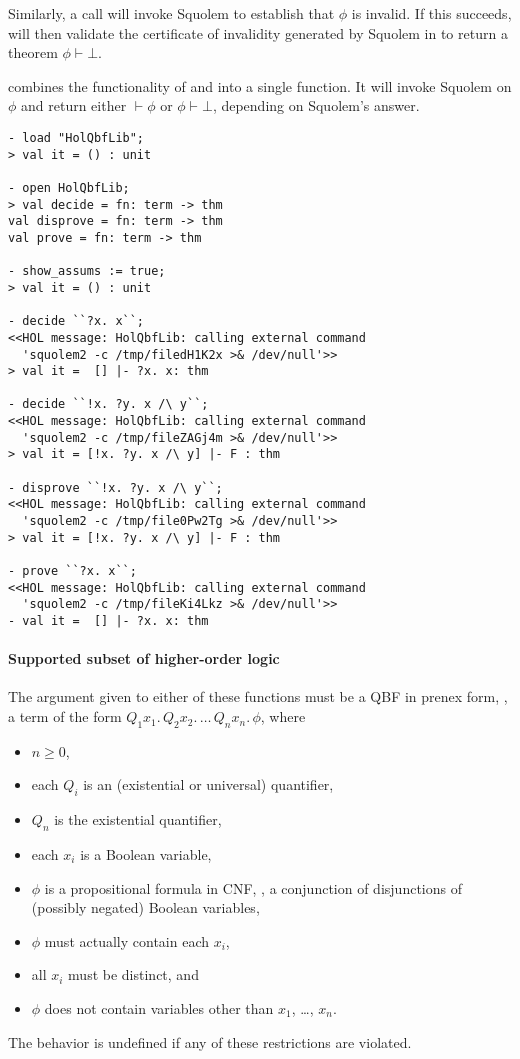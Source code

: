 Similarly, a call  will invoke Squolem to
establish that $\phi$ is invalid.  If this succeeds, 
will then validate the certificate of invalidity generated by Squolem
in \HOL{} to return a theorem $\phi \vdash \bot$.

 combines the functionality of  and
 into a single function.  It will invoke Squolem on
$\phi$ and return either $\vdash \phi$ or $\phi \vdash \bot$,
depending on Squolem's answer.

\begin{session}
\begin{verbatim}
- load "HolQbfLib";
> val it = () : unit

- open HolQbfLib;
> val decide = fn: term -> thm
val disprove = fn: term -> thm
val prove = fn: term -> thm

- show_assums := true;
> val it = () : unit

- decide ``?x. x``;
<<HOL message: HolQbfLib: calling external command
  'squolem2 -c /tmp/filedH1K2x >& /dev/null'>>
> val it =  [] |- ?x. x: thm

- decide ``!x. ?y. x /\ y``;
<<HOL message: HolQbfLib: calling external command
  'squolem2 -c /tmp/fileZAGj4m >& /dev/null'>>
> val it = [!x. ?y. x /\ y] |- F : thm

- disprove ``!x. ?y. x /\ y``;
<<HOL message: HolQbfLib: calling external command
  'squolem2 -c /tmp/file0Pw2Tg >& /dev/null'>>
> val it = [!x. ?y. x /\ y] |- F : thm

- prove ``?x. x``;
<<HOL message: HolQbfLib: calling external command
  'squolem2 -c /tmp/fileKi4Lkz >& /dev/null'>>
- val it =  [] |- ?x. x: thm
\end{verbatim}
\end{session}

\paragraph{Supported subset of higher-order logic}

The argument given to either of these functions must be a QBF in
prenex form, \ie, a term of the form $Q_1 x_1. \, Q_2 x_2. \, \ldots
\, Q_n x_n. \, \phi$, where
\begin{itemize}
\item $n \geq 0$,
\item each $Q_i$ is an (existential or universal) quantifier,
\item $Q_n$ is the existential quantifier,
\item each $x_i$ is a Boolean variable,
\item $\phi$ is a propositional formula in CNF, \ie, a conjunction of
  disjunctions of (possibly negated) Boolean variables,
\item $\phi$ must actually contain each $x_i$,
\item all $x_i$ must be distinct, and
\item $\phi$ does not contain variables other than $x_1$, \dots,
  $x_n$.
\end{itemize}
The behavior is undefined if any of these restrictions are violated.


